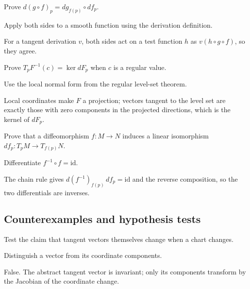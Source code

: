 \begin{exercise}\label{exr:vii04-ped-07}
Prove \(d(g\circ f)_p=dg_{f(p)}\circ df_p\).
\end{exercise}
\begin{hint}
Apply both sides to a smooth function using the derivation definition.
\end{hint}
\begin{solution}
For a tangent derivation \(v\), both sides act on a test function \(h\) as \(v(h\circ g\circ f)\), so they agree.
\end{solution}

\begin{exercise}\label{exr:vii04-ped-08}
Prove \(T_pF^{-1}(c)=\ker dF_p\) when \(c\) is a regular value.
\end{exercise}
\begin{hint}
Use the local normal form from the regular level-set theorem.
\end{hint}
\begin{solution}
Local coordinates make \(F\) a projection; vectors tangent to the level set are exactly those with zero components in the projected directions, which is the kernel of \(dF_p\).
\end{solution}

\begin{exercise}\label{exr:vii04-ped-09}
Prove that a diffeomorphism \(f:M\to N\) induces a linear isomorphism \(df_p:T_pM\to T_{f(p)}N\).
\end{exercise}
\begin{hint}
Differentiate \(f^{-1}\circ f=\mathrm{id}\).
\end{hint}
\begin{solution}
The chain rule gives \(d(f^{-1})_{f(p)}\,df_p=\mathrm{id}\) and the reverse composition, so the two differentials are inverses.
\end{solution}

\subsection*{Counterexamples and hypothesis tests}

\begin{exercise}\label{exr:vii04-ped-10}
Test the claim that tangent vectors themselves change when a chart changes.
\end{exercise}
\begin{hint}
Distinguish a vector from its coordinate components.
\end{hint}
\begin{solution}
False.  The abstract tangent vector is invariant; only its components transform by the Jacobian of the coordinate change.
\end{solution}

